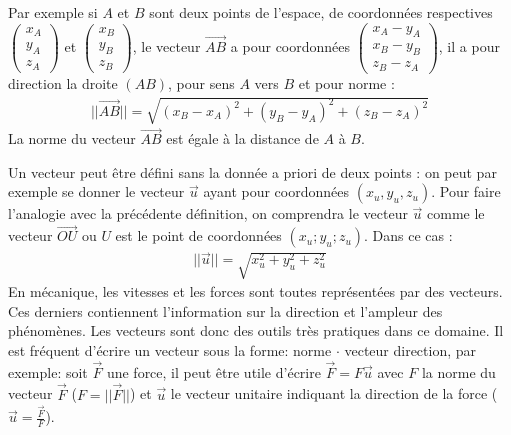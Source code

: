 \documentclass[letterpaper,10pt,english]{jupyterBook}
\begin{document}
\sphinxAtStartPar
Par exemple si \(A\) et \(B\) sont deux points de l’espace, de coordonnées respectives \(\begin{pmatrix} x_A \\ y_A \\ z_A \end{pmatrix}\) et \(\begin{pmatrix} x_B \\ y_B \\ z_B \end{pmatrix}\), le vecteur \(\vec{AB}\) a pour coordonnées \(\begin{pmatrix}x_A-y_A \\ x_B-y_B \\ z_B-z_A \end{pmatrix}\), il a pour direction la droite \((AB)\), pour sens \(A\) vers \(B\) et pour norme :
\begin{equation*}
\begin{split}
||\vec{AB}|| = \sqrt{(x_B-x_A)^2+(y_B-y_A)^2+(z_B-z_A)^2}
\end{split}
\end{equation*}
\sphinxAtStartPar
La norme du vecteur \(\vec{AB}\) est égale à la distance de \(A\) à \(B\).

\sphinxAtStartPar
Un vecteur peut être défini sans la donnée a priori de deux points : on peut par exemple se donner le vecteur \(\vec{u}\) ayant pour coordonnées \((x_u,y_u,z_u)\). Pour faire l’analogie avec la précédente définition, on comprendra le vecteur \(\vec{u}\) comme le vecteur \(\vec{O U}\) ou \(U\) est le point de coordonnées \((x_u;y_u;z_u)\). Dans ce cas :
\begin{equation*}
\begin{split}
||\vec{u}|| = \sqrt{x_u^2+y_u^2 + z_u^2}
\end{split}
\end{equation*}
\sphinxAtStartPar
{} En mécanique, les vitesses et les forces sont toutes représentées par des vecteurs. Ces derniers contiennent l’information sur la direction et l’ampleur des phénomènes. Les vecteurs sont donc des outils très pratiques dans ce domaine. Il est fréquent d’écrire un vecteur sous la forme: norme \(\cdot\) vecteur direction, par exemple: soit \(\vec{F}\) une force, il peut être utile d’écrire \(\vec{F} = F \vec{u}\) avec \(F\) la norme du vecteur \(\vec{F}\) (\(F=||\vec{F}||\)) et \(\vec{u}\) le vecteur unitaire indiquant la direction de la force (\(\vec{u} = \frac{\vec{F}}{F}\)).
\end{document}
